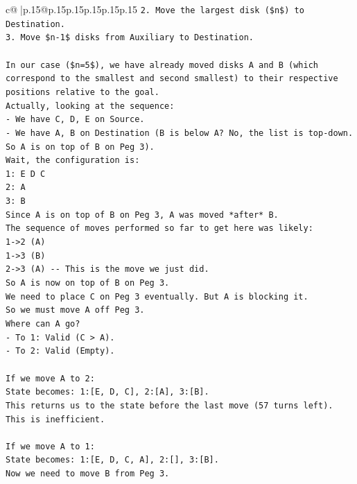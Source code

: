 \documentclass{article}
\begin{document}
{\begin{supertabular}{c@{$\;$}|p{.15\linewidth}@{}p{.15\linewidth}p{.15\linewidth}p{.15\linewidth}p{.15\linewidth}p{.15\linewidth}}
{{{\texttt{2. Move the largest disk (\$n\$) to Destination.} \\
\texttt{3. Move \$n{-}1\$ disks from Auxiliary to Destination.} \\
\\ 
\texttt{In our case (\$n=5\$), we have already moved disks A and B (which correspond to the smallest and second smallest) to their respective positions relative to the goal.} \\
\texttt{Actually, looking at the sequence:} \\
\texttt{{-} We have C, D, E on Source.} \\
\texttt{{-} We have A, B on Destination (B is below A? No, the list is top{-}down. So A is on top of B on Peg 3).} \\
\texttt{Wait, the configuration is:} \\
\texttt{1: E D C} \\
\texttt{2: A} \\
\texttt{3: B} \\
\texttt{Since A is on top of B on Peg 3, A was moved *after* B.} \\
\texttt{The sequence of moves performed so far to get here was likely:} \\
\texttt{1{-}>2 (A)} \\
\texttt{1{-}>3 (B)} \\
\texttt{2{-}>3 (A) {-}{-} This is the move we just did.} \\
\texttt{So A is now on top of B on Peg 3.} \\
\texttt{We need to place C on Peg 3 eventually. But A is blocking it.} \\
\texttt{So we must move A off Peg 3.} \\
\texttt{Where can A go?} \\
\texttt{{-} To 1: Valid (C > A).} \\
\texttt{{-} To 2: Valid (Empty).} \\
\\ 
\texttt{If we move A to 2:} \\
\texttt{State becomes: 1:{[}E, D, C{]}, 2:{[}A{]}, 3:{[}B{]}.} \\
\texttt{This returns us to the state before the last move (57 turns left). This is inefficient.} \\
\\ 
\texttt{If we move A to 1:} \\
\texttt{State becomes: 1:{[}E, D, C, A{]}, 2:{[}{]}, 3:{[}B{]}.} \\
\texttt{Now we need to move B from Peg 3.} \\
}}}
\end{supertabular}}
\end{document}
